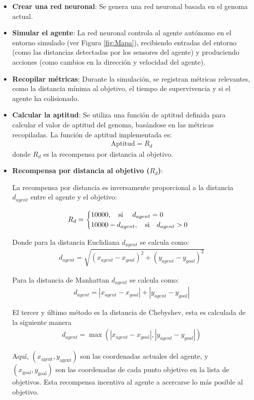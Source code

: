 \documentclass[conference]{IEEEtran}
\begin{document}
\begin{itemize} 
\item \textbf{Crear una red neuronal}: Se genera una red neuronal basada en el genoma actual. 
\item \textbf{Simular el agente}: La red neuronal controla al agente autónomo en el entorno simulado (ver Figura \ref{fig:Mapa}), recibiendo entradas del entorno (como las distancias detectadas por los sensores del agente) y produciendo acciones (como cambios en la dirección y velocidad del agente). 
\item \textbf{Recopilar métricas}: Durante la simulación, se registran métricas relevantes, como la distancia mínima al objetivo, el tiempo de supervivencia y si el agente ha colisionado. 
\item \textbf{Calcular la aptitud}: Se utiliza una función de aptitud definida para calcular el valor de aptitud del genoma, basándose en las métricas recopiladas. 
La función de aptitud implementada es:
\begin{align*} 
    \text{Aptitud} = R_d
\end{align*}
donde $R_d$ es la recompensa por distancia al objetivo. 

\item \textbf{Recompensa por distancia al objetivo ($R_d$)}:

La recompensa por distancia es inversamente proporcional a la distancia $d_{agent}$ entre el agente y el objetivo:

\begin{align*} 
R_d = \begin{cases} 
10000, \quad \text{si } \quad d_{agent} = 0 
\cr 10000-d_{agent}, \quad \text{si} \quad d_{agent} > 0 
\end{cases} 
\end{align*}

Donde para la distancia Euclidiana $d_{agent}$ se calcula como:
\begin{align*} 
    d_{agent} = {\sqrt{(x_{agent} - x_{goal})^2 + (y_{agent} - y_{goal})^2}} 
\end{align*}

Para la distancia de Manhattan $d_{agent}$ se calcula como:
\begin{align*} 
    d_{agent} = |x_{agent} - x_{goal}| + |y_{agent} - y_{goal}|
\end{align*}

El tercer y último método es la distancia de Chebyshev, esta es calculada de la siguiente manera 
\begin{align*} 
    d_{agent} = \max(|x_{agent} - x_{goal}|, |y_{agent} - y_{goal}|)
\end{align*}



Aquí, $(x_{\text{agent}}, y_{\text{agent}})$ son las coordenadas actuales del agente, y $(x_{\text{goal}}, y_{\text{goal}})$ son las coordenadas de cada punto objetivo en la lista de objetivos. Esta recompensa incentiva al agente a acercarse lo más posible al objetivo.\\
\end{itemize}
\end{document}
